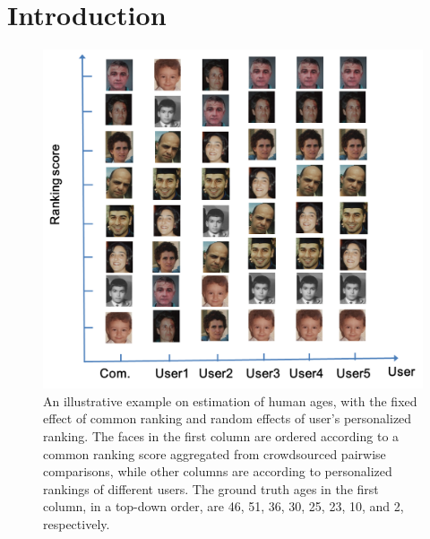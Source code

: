 \documentclass[10pt,journal,cspaper,compsoc]{IEEEtran}
\begin{document}
\maketitle


\IEEEdisplaynotcompsoctitleabstractindextext


%
\IEEEpeerreviewmaketitle


\section{Introduction}
\begin{figure}[t]
 \begin{center}
\includegraphics[width=0.8\linewidth]{1.png}
  \caption{An illustrative example on estimation of human ages, with the fixed effect of common ranking and random effects of user's personalized ranking. The faces in the first column are ordered according to a common ranking score aggregated from crowdsourced pairwise comparisons, while other columns are according to personalized rankings of different users. The ground truth ages in the first column, in a top-down order, are 46, 51, 36, 30, 25, 23, 10, and 2, respectively.} \label{introimage}
\end{center} \label{fig:age0}
\end{figure}
\end{document}
